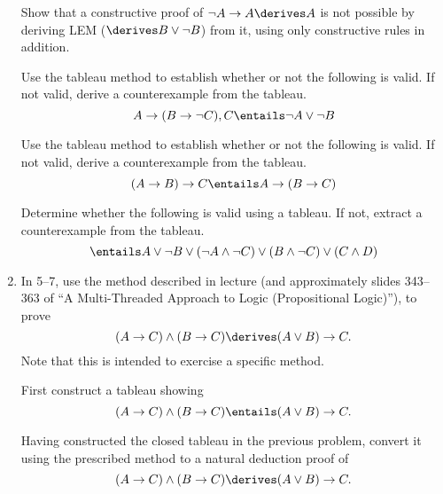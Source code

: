 \documentclass{cs81-homework}
\begin{document}
\begin{enumerate}
 Show that a constructive proof of \(\neg A \to A \derives A\)
  is not possible by deriving LEM (\(\derives B \lor \neg B\)) from it, using
  only constructive rules in addition.

  \begin{solution}
  \end{solution}

 Use the tableau method to establish whether or not the
  following is valid. If not valid, derive a counterexample from the tableau.
  \[
    A \to (B \to \neg C), C \entails \neg A \lor \neg B
  \]

  \begin{solution}
  \end{solution}

 Use the tableau method to establish whether or not the
  following is valid. If not valid, derive a counterexample from the tableau.
  \[
    (A \to B) \to C \entails A \to (B \to C)
  \]
  
  \begin{solution}
  \end{solution}

 Determine whether the following is valid using a tableau. If
  not, extract a counterexample from the tableau.
  \[
    \entails A \lor \neg B \lor (\neg A \land \neg C) \lor (B \land \neg C) \lor
    (C \land D)
  \]

  \begin{solution}
  \end{solution}

\item[] In 5--7, use the method described in lecture (and approximately slides 343--363 of 
  “A Multi-Threaded Approach to Logic (Propositional Logic)”), to prove
  \[
    (A \to C) \land (B \to C) \derives (A \lor B) \to C.
  \]
  Note that this is intended to exercise a specific method.
  
 First construct a tableau showing
  \[
    (A \to C) \land (B \to C) \entails (A \lor B) \to C.
  \]

  \begin{solution}
  \end{solution}

 Having constructed the closed tableau in the previous problem,
  convert it using the prescribed method to a natural deduction proof of
  \[
    (A \to C) \land (B \to C) \derives (A \lor B) \to C.
  \]


\end{enumerate}
\end{document}

